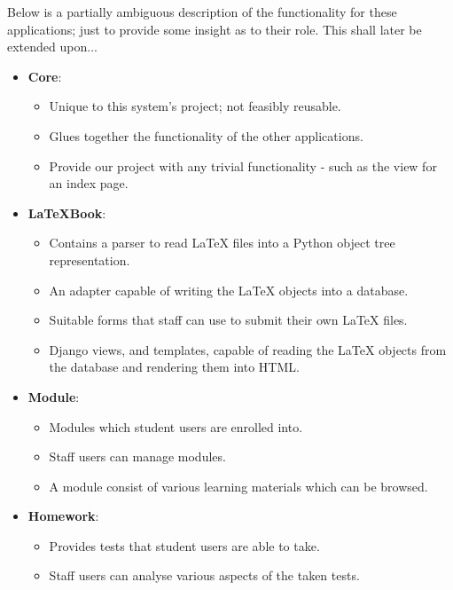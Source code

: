 		Below is a partially ambiguous description of the functionality for these applications; just to provide some insight as to their role. This shall later be extended upon...
		
		\begin{itemize}
			\item \textbf{Core}:
				\begin{itemize}
					\item Unique to this system's project; not feasibly reusable.
					\item Glues together the functionality of the other applications.
					\item Provide our project with any trivial functionality - such as the view for an index page.
				\end{itemize}

			\item \textbf{LaTeXBook}:
				\begin{itemize}
					\item Contains a parser to read LaTeX files into a Python object tree representation.
					\item An adapter capable of writing the LaTeX objects into a database.
					\item Suitable forms that staff can use to submit their own LaTeX files.
					\item Django views, and templates, capable of reading the LaTeX objects from the database and rendering them into HTML.
				\end{itemize}
				
			\item \textbf{Module}:
				\begin{itemize}
					\item Modules which student users are enrolled into.
					\item Staff users can manage modules.
					\item A module consist of various learning materials which can be browsed.
				\end{itemize} 

			\item \textbf{Homework}:
				\begin{itemize}
					\item Provides tests that student users are able to take.
					\item Staff users can analyse various aspects of the taken tests.
				\end{itemize} 
		\end{itemize}
	
